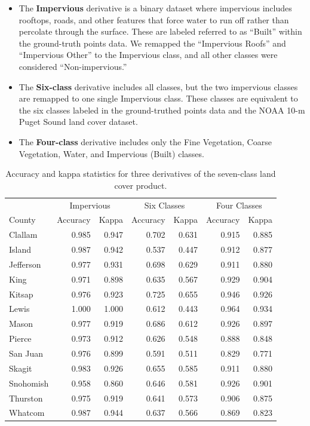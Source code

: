 \documentclass[
]{report}
\providecommand{\tightlist}{%
  \setlength{\itemsep}{0pt}\setlength{\parskip}{0pt}}
\begin{document}
\begin{itemize}
\tightlist
\item
  The \textbf{Impervious} derivative is a binary dataset where impervious includes rooftops, roads, and other features that force water to run off rather than percolate through the surface. These are labeled referred to as ``Built'' within the ground-truth points data. We remapped the ``Impervious Roofs'' and ``Impervious Other'' to the Impervious class, and all other classes were considered ``Non-impervious.''
\item
  The \textbf{Six-class} derivative includes all classes, but the two impervious classes are remapped to one single Impervious class. These classes are equivalent to the six classes labeled in the ground-truthed points data and the NOAA 10-m Puget Sound land cover dataset.
\item
  The \textbf{Four-class} derivative includes only the Fine Vegetation, Coarse Vegetation, Water, and Impervious (Built) classes.
\end{itemize}

\begin{table}

\caption{\label{tab:landcovertable}Accuracy and kappa statistics for three derivatives of the seven-class 
                              land cover product.}
\centering
\begin{tabular}[t]{l|r|r|r|r|r|r}
\hline
\multicolumn{1}{c|}{ } & \multicolumn{2}{c|}{Impervious} & \multicolumn{2}{c|}{Six Classes} & \multicolumn{2}{c}{Four Classes} \\
\cline{2-3} \cline{4-5} \cline{6-7}
County & Accuracy & Kappa & Accuracy & Kappa & Accuracy & Kappa\\
\hline
Clallam & 0.985 & 0.947 & 0.702 & 0.631 & 0.915 & 0.885\\
\hline
Island & 0.987 & 0.942 & 0.537 & 0.447 & 0.912 & 0.877\\
\hline
Jefferson & 0.977 & 0.931 & 0.698 & 0.629 & 0.911 & 0.880\\
\hline
King & 0.971 & 0.898 & 0.635 & 0.567 & 0.929 & 0.904\\
\hline
Kitsap & 0.976 & 0.923 & 0.725 & 0.655 & 0.946 & 0.926\\
\hline
Lewis & 1.000 & 1.000 & 0.612 & 0.443 & 0.964 & 0.934\\
\hline
Mason & 0.977 & 0.919 & 0.686 & 0.612 & 0.926 & 0.897\\
\hline
Pierce & 0.973 & 0.912 & 0.626 & 0.548 & 0.888 & 0.848\\
\hline
San Juan & 0.976 & 0.899 & 0.591 & 0.511 & 0.829 & 0.771\\
\hline
Skagit & 0.983 & 0.926 & 0.655 & 0.585 & 0.911 & 0.880\\
\hline
Snohomish & 0.958 & 0.860 & 0.646 & 0.581 & 0.926 & 0.901\\
\hline
Thurston & 0.975 & 0.919 & 0.641 & 0.573 & 0.906 & 0.875\\
\hline
Whatcom & 0.987 & 0.944 & 0.637 & 0.566 & 0.869 & 0.823\\
\hline
\end{tabular}
\end{table}
\end{document}
